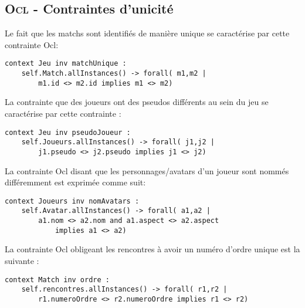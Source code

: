 
\subsection{\textsc{Ocl} - Contraintes d'unicité}
\label{sec:question3}

Le fait que les matchs sont identifiés de manière unique se caractérise par cette contrainte Ocl:

\begin{lstlisting}[caption=Contrainte sur l'unicité d'un match,captionpos=b,label={lst:match},language=OCL]
context Jeu inv matchUnique :
    self.Match.allInstances() -> forall( m1,m2 |
        m1.id <> m2.id implies m1 <> m2)
\end{lstlisting}

La contrainte que des joueurs ont des pseudos différents au sein du jeu se caractérise par cette contrainte :

\begin{lstlisting}[caption=Contrainte sur les pseudos,captionpos=b,label={lst:pseudos},language=OCL]
context Jeu inv pseudoJoueur :
    self.Joueurs.allInstances() -> forall( j1,j2 |
        j1.pseudo <> j2.pseudo implies j1 <> j2)
\end{lstlisting}

La contrainte Ocl disant que les personnages/avatars d'un joueur sont nommés différemment est exprimée comme suit:

\begin{lstlisting}[caption=Contrainte sur le nom,captionpos=b,label={lst:nomAvatar},language=OCL]
context Joueurs inv nomAvatars :
    self.Avatar.allInstances() -> forall( a1,a2 |
        a1.nom <> a2.nom and a1.aspect <> a2.aspect
            implies a1 <> a2)
\end{lstlisting}

La contrainte Ocl obligeant les rencontres à avoir un numéro d'ordre unique est la suivante :

\begin{lstlisting}[caption=Contrainte sur le numéro d'ordre unique,captionpos=b,label={lst:numUnique},language=OCL]
context Match inv ordre :
    self.rencontres.allInstances() -> forall( r1,r2 |
        r1.numeroOrdre <> r2.numeroOrdre implies r1 <> r2)
\end{lstlisting}